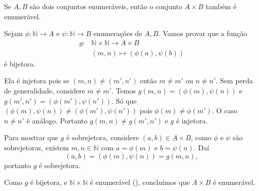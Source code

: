 \documentclass[../main.tex]{subfiles}
\begin{document}
\begin{teo}\label{enum-teo-ABEnumeraveisAxBEnumeravel}
    Se $A, B$ são dois conjuntos enumeráveis, então o conjunto $A \times B$ também é enumerável.
\end{teo}
\begin{dem}
    Sejam $\phi \colon \mathbb{N} \to A$ e $\psi \colon \mathbb{N} \to B$ enumerações de $A,B$. Vamos provar que a função 
    \begin{align*}
        g \colon & \mathbb{N} \times \mathbb{N} \to A \times B \\
                 & (m,n) \mapsto (\phi(a),\psi(b))
    \end{align*}
    é bijetora.

    Ela é injetora pois se $(m,n) \neq (m',n')$ então $m \neq m'$ ou $n \neq n'$. Sem perda de generalidade, considere $m \neq m'$.
    Temos  $g(m,n) = (\phi(m),\psi(n))$ e \\ 
    $g(m',n') = (\phi(m'),\psi(n'))$. Só que $(\phi(m),\psi(n)) \neq (\phi(m'),\psi(n'))$ pois 
    $\phi(m) \neq \phi(m')$. O caso $n \neq n'$ é análogo. Portanto $g(m,n) \neq g(m',n')$ e $g$ é injetora.

    Para mostrar que $g$ é sobrejetora, considere $(a,b) \in A \times B$, como $\phi$ e $\psi$ são sobrejetoras, existem $m, n \in \mathbb{N}$ com 
    $a = \phi(m)$ e $b = \psi(n)$. Daí  
    \[ (a,b) = (\phi(m), \psi(n)) = g(m,n), \] 
    portanto $g$ é sobrejetora.

    Como $g$ é bijetora, e $\mathbb{N} \times \mathbb{N}$ é enumerável (), concluímos que $A \times B$ é enumerável.
\end{dem}
\end{document}
